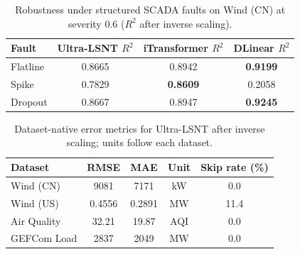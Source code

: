 ﻿\documentclass[review,1p,times]{elsarticle}
\begin{document}
\begin{table}[t]
\centering
\caption{Robustness under structured SCADA faults on Wind (CN) at severity 0.6 ($R^2$ after inverse scaling).}
\label{tab:robust_structured_sev06}
\begin{tabular}{lccc}
\toprule
Fault & Ultra-LSNT $R^2$ & iTransformer $R^2$ & DLinear $R^2$ \\
\midrule
Flatline & 0.8665 & 0.8942 & \textbf{0.9199} \\
Spike & 0.7829 & \textbf{0.8609} & 0.2058 \\
Dropout & 0.8667 & 0.8947 & \textbf{0.9245} \\
\bottomrule
\end{tabular}
\end{table}

\begin{table}[t]
\centering
\caption{Robustness under missingness and time-axis imputation on Wind (CN) (3 seeds, mean$\pm$std).}
\label{tab:robust_missingness}
\begingroup
\setlength{\tabcolsep}{4pt}
\small
{}
\endgroup
\end{table}

\begin{table}[t]
\centering
\caption{Dataset-native error metrics for Ultra-LSNT after inverse scaling; units follow each dataset.}
\label{tab:multi_domain_baselines}
\begin{tabular}{lcccc}
\toprule
Dataset & RMSE & MAE & Unit & Skip rate (\%)\\
\midrule
Wind (CN) & 9081 & 7171 & kW & 0.0 \\
Wind (US) & 0.4556 & 0.2891 & MW & 11.4 \\
Air Quality & 32.21 & 19.87 & AQI & 0.0 \\
GEFCom Load & 2837 & 2049 & MW & 0.0 \\
\bottomrule
\end{tabular}
\end{table}
\end{document}
